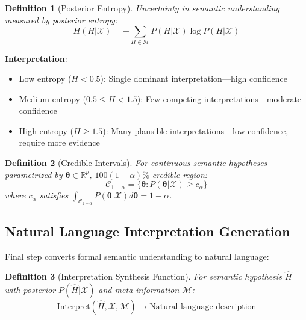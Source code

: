\documentclass[12pt,a4paper]{article}
\newtheorem{definition}{Definition}
\begin{document}
\begin{definition}[Posterior Entropy]
Uncertainty in semantic understanding measured by posterior entropy:
\begin{equation}
H(H | \mathcal{X}) = -\sum_{H \in \mathcal{H}} P(H | \mathcal{X}) \log P(H | \mathcal{X})
\end{equation}
\end{definition}

\textbf{Interpretation}:
\begin{itemize}
\item Low entropy ($H < 0.5$): Single dominant interpretation—high confidence
\item Medium entropy ($0.5 \leq H < 1.5$): Few competing interpretations—moderate confidence
\item High entropy ($H \geq 1.5$): Many plausible interpretations—low confidence, require more evidence
\end{itemize}

\begin{definition}[Credible Intervals]
For continuous semantic hypotheses parametrized by $\boldsymbol{\theta} \in \mathbb{R}^p$, $100(1-\alpha)\%$ credible region:
\begin{equation}
\mathcal{C}_{1-\alpha} = \{\boldsymbol{\theta}: P(\boldsymbol{\theta} | \mathcal{X}) \geq c_{\alpha}\}
\end{equation}
where $c_{\alpha}$ satisfies $\int_{\mathcal{C}_{1-\alpha}} P(\boldsymbol{\theta} | \mathcal{X}) d\boldsymbol{\theta} = 1 - \alpha$.
\end{definition}

\subsection{Natural Language Interpretation Generation}

Final step converts formal semantic understanding to natural language:

\begin{definition}[Interpretation Synthesis Function]
For semantic hypothesis $\hat{H}$ with posterior $P(\hat{H} | \mathcal{X})$ and meta-information $\mathcal{M}$:
\begin{equation}
\text{Interpret}(\hat{H}, \mathcal{X}, \mathcal{M}) \to \text{Natural language description}
\end{equation}
\end{definition}
\end{document}

